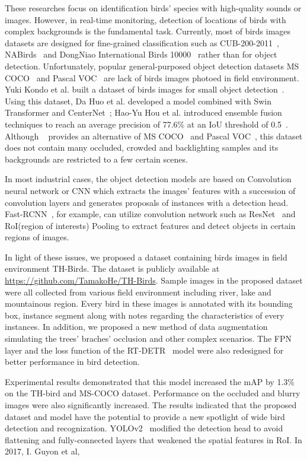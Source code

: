These researches focus on identification birds' species with 
high-quality sounds or images. However, in real-time monitoring, 
detection of locations of birds with complex backgrounds is the 
fundamental task. Currently, most of birds images datasets 
are designed for fine-grained classification such as CUB-200-2011~\cite{dataset1}, NABirds~\cite{dataset2} and DongNiao International Birds 10000~\cite{dataset3}
rather than for object detection. Unfortunately, 
popular general-purposed object detection datasets MS COCO~\cite{datasetcoco} and Pascal VOC~\cite{datasetvoc} 
are lack of birds images photoed in field environment.
Yuki Kondo et al. built a dataset of birds images for small object detection~\cite{datasetmva}.
Using this dataset, Da Huo et al. developed a model 
combined with Swin Transformer and CenterNet~;
Hao-Yu Hou et al. introduced ensemble fusion techniques to reach 
an average precision of 77.6\% at an IoU threshold of 0.5~\cite{Swint,centernet,mva1,mva2}.
Although ~\cite{datasetmva} provides an alternative of MS COCO~\cite{datasetcoco} and Pascal VOC~\cite{datasetvoc},
this dataset does not contain many occluded, crowded and backlighting 
samples and its backgrounds are restricted to a few certain scenes.

In most industrial cases, the object detection models are based on Convolution neural network or CNN which extracts 
the images' features with a succession of convolution layers and generates proposals of instances with a detection head.
Fast-RCNN~\cite{fastrcnn}, for example, can utilize convolution network such as ResNet~\cite{resnet} and RoI(region of interests)
Pooling to extract features and detect objects in certain regions of images. 

In light of these issues, we proposed a dataset 
containing birds images in field environment TH-Birds. 
The dataset is publicly available at \href{https://github.com/TamakoHe/TH-Birds}{https://github.com/TamakoHe/TH-Birds}. 
Sample images in the proposed dataset were all collected from various field environment including river, lake and mountainous region. Every bird in these images is annotated with its bounding box, instance segment along with notes
regarding the characteristics of every instances.  In addition, we proposed 
a new method of data augmentation simulating the trees' braches' occlusion 
and other complex scenarios. The FPN layer and the loss function of the 
RT-DETR~\cite{RTDETR} model were also redesigned for better performance in bird detection. 

Experimental results demonstrated that this model increased the mAP by 
1.3\% on the TH-bird and MS-COCO dataset. Performance on the occluded 
and blurry images were also significantly increased. The results indicated 
that the proposed dataset and model have the potential to provide a new spotlight
of wide bird detection and recognization. YOLOv2~\cite{yolov2} modified the detection head 
to avoid flattening and fully-connected layers that weakened the spatial features in RoI.
In 2017, I. Guyon et al, 
